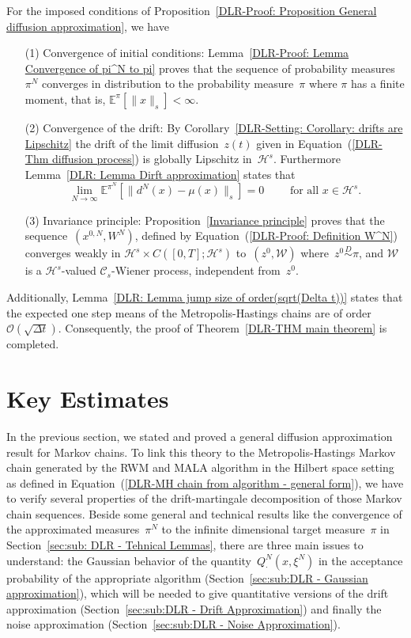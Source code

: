 For the imposed conditions of Proposition~\ref{DLR-Proof: Proposition General diffusion approximation}, we have
 \begin{enumerate}
    \item[(1)] Convergence of initial conditions: Lemma~\ref{DLR-Proof: Lemma Convergence of pi^N to pi} proves that the sequence of probability measures~$\pi^N$ converges in distribution to the probability measure~$\pi$ where $\pi$ has a finite moment, that is, $\mathbb{E}^{\pi}[\|x\|_s]<\infty$. 
    \item[(2)] Convergence of the drift: By Corollary~\ref{DLR-Setting: Corollary: drifts are Lipschitz} the drift of the limit diffusion~$z(t)$ given in Equation~(\ref{DLR-Thm diffusion process}) is globally Lipschitz in~$\mathcal{H}^s$. Furthermore Lemma~\ref{DLR: Lemma Dirft approximation} states that 
    \begin{equation*}
      \lim_{N \to \infty} \mathbb{E}^{\pi^N}[ \|  d^N(x) - \mu(x) \|_{s} ] = 0 \qquad \text{ for all } x \in \mathcal{H}^s.
    \end{equation*}
    \item[(3)] Invariance principle: Proposition~\ref{Invariance principle} proves that the sequence~$(x^{0,N}, W^N)$, defined by Equation~(\ref{DLR-Proof: Definition W^N}) converges weakly in $\mathcal{H}^s \times C([0,T]; \mathcal{H}^s)$ to~$(z^0, \mathcal{W})$ where~$z^0 \stackrel{D}{\sim} \pi$, and $\mathcal{W}$ is a $\mathcal{H}^s$-valued $\mathcal{C}_s$-Wiener process, independent from~$z^0$.
  \end{enumerate}
Additionally, Lemma~\ref{DLR: Lemma jump size of order(sqrt(Delta t))} states that the expected one step means of the Metropolis-Hastings chains are of order~$\mathcal{O}(\sqrt{\Delta t})$. Consequently, the proof of Theorem~\ref{DLR-THM main theorem} is completed.



\section{Key Estimates}
\label{sec:DLR-Estimates}

In the previous section, we stated and proved a general diffusion approximation result for Markov chains. To link this theory to the Metropolis-Hastings Markov chain generated by the RWM and MALA algorithm in the Hilbert space setting as defined in Equation~(\ref{DLR-MH chain from algorithm - general form}), we have to verify several properties of the drift-martingale decomposition of those Markov chain sequences. Beside some general and technical results like the convergence of the approximated measures~$\pi^N$ to the infinite dimensional target measure~$\pi$ in Section~\ref{sec:sub: DLR - Tehnical Lemmas}, there are three main issues to understand: the Gaussian behavior of the quantity~$Q^{N}_{\cdot}(x, \xi^N)$ in the acceptance probability of the appropriate algorithm (Section~\ref{sec:sub:DLR - Gaussian approximation}), which will be needed to give quantitative versions of the drift approximation (Section~\ref{sec:sub:DLR - Drift Approximation}) and finally the noise approximation (Section~\ref{sec:sub:DLR - Noise Approximation}).

